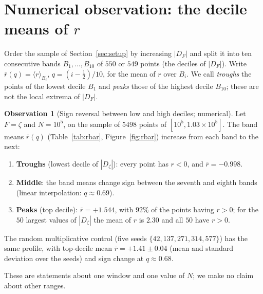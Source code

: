 \documentclass[11pt]{amsart}
\theoremstyle{definition}
\newtheorem{observation}[theorem]{Observation}
\theoremstyle{remark}
\begin{document}
\section{Numerical observation: the decile means of \texorpdfstring{$r$}{r}}
\label{sec:main}

Order the sample of Section~\ref{sec:setup} by increasing $|D_F|$ and
split it into ten consecutive bands $B_1,\dots,B_{10}$ of $550$ or $549$
points (the deciles of $|D_F|$). Write $\bar r(q)=\langle r\rangle_{B_i}$, $q=(i-\tfrac12)/10$,
for the mean of $r$ over $B_i$. We call \emph{troughs} the points of the
lowest decile $B_1$ and \emph{peaks} those of the highest decile
$B_{10}$; these are not the local extrema of $|D_F|$.

\begin{observation}[Sign reversal between low and high deciles; numerical]\label{thm:main}
Let $F=\zeta$ and $N=10^5$, on the sample of $5498$ points of
$[10^5,1.03\times10^5]$. The band means $\bar r(q)$
(Table~\ref{tab:rbar}, Figure~\ref{fig:rbar}) increase from each band to
the next:
\begin{enumerate}[label=\textup{(\roman*)}]
\item \textbf{Troughs} (lowest decile of $|D_\zeta|$): every point has
$r<0$, and $\bar r=-0.998$.
\item \textbf{Middle}: the band means change sign between the seventh and
eighth bands (linear interpolation: $q\approx0.69$).
\item \textbf{Peaks} (top decile): $\bar r=+1.544$, with $92\%$ of the
points having $r>0$; for the $50$ largest values of $|D_\zeta|$ the mean
of $r$ is $2.30$ and all $50$ have $r>0$.
\end{enumerate}
The random multiplicative control (five seeds
$\{42,137,271,314,577\}$) has the same profile, with top-decile mean
$\bar r=+1.41\pm0.04$ (mean and standard deviation over the seeds) and
sign change at $q\approx0.68$.
\end{observation}

These are statements about one window and one value of $N$; we make no
claim about other ranges.
\end{document}
